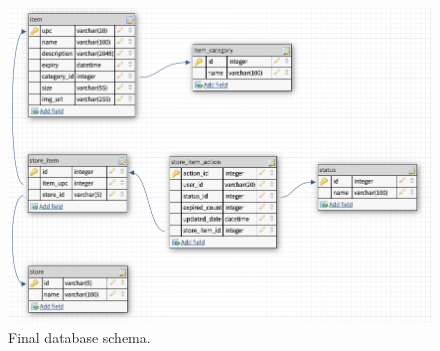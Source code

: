 \documentclass[a4paper,11pt]{report}
\begin{document}
\begin{figure}[H]
    \centering
    \includegraphics[width=12.5cm]{./assets/images/Database-Schema.png}
    \caption{Final database schema.}
    \label{fig:DBSchema}
\end{figure}
\end{document}

